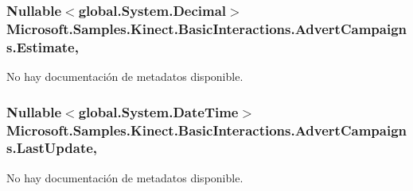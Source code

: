 \hypertarget{class_microsoft_1_1_samples_1_1_kinect_1_1_basic_interactions_1_1_advert_campaigns_a76a56b713f0945b504bad85b90b8b50f}{
\subsubsection[{Estimate}]{\setlength{\rightskip}{0pt plus 5cm}Nullable$<$global.\-System.\-Decimal$>$ Microsoft.\-Samples.\-Kinect.\-Basic\-Interactions.\-Advert\-Campaigns.\-Estimate\hspace{0.3cm}{\ttfamily [get]}, {\ttfamily [set]}}}\label{class_microsoft_1_1_samples_1_1_kinect_1_1_basic_interactions_1_1_advert_campaigns_a76a56b713f0945b504bad85b90b8b50f}


No hay documentación de metadatos disponible. 

\hypertarget{class_microsoft_1_1_samples_1_1_kinect_1_1_basic_interactions_1_1_advert_campaigns_a2e8334eef78608d8e30033d1444d818f}{
\subsubsection[{Last\-Update}]{\setlength{\rightskip}{0pt plus 5cm}Nullable$<$global.\-System.\-Date\-Time$>$ Microsoft.\-Samples.\-Kinect.\-Basic\-Interactions.\-Advert\-Campaigns.\-Last\-Update\hspace{0.3cm}{\ttfamily [get]}, {\ttfamily [set]}}}\label{class_microsoft_1_1_samples_1_1_kinect_1_1_basic_interactions_1_1_advert_campaigns_a2e8334eef78608d8e30033d1444d818f}


No hay documentación de metadatos disponible. 

